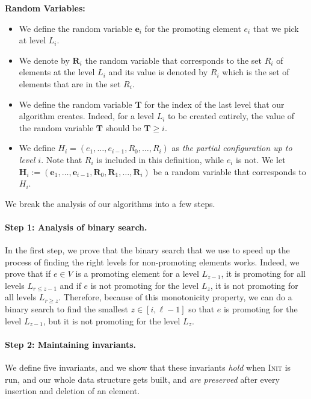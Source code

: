 \documentclass[11pt]{article}
\newcommand{\init}{\textsc{Init}}
\newcommand{\bR}{\ensuremath{\mathbf{R}}}
\newcommand{\bE}{\ensuremath{\mathbf{e}}}
\newcommand{\bT}{\ensuremath{\mathbf{T}}}
\newcommand{\bH}{\ensuremath{\mathbf{H}}}
\begin{document}
\begin{tcolorbox}[width=\linewidth, colback=white!80!gray,boxrule=0pt,frame hidden, sharp corners]

\textbf{Random Variables:}
\begin{itemize}
    \item  We define the random variable $\bE_i$ for the promoting element $e_i$ that we pick at level $L_i$. 
     \item  We denote by $\bR_i$ the random variable that corresponds to the set $R_i$ of elements at the level $L_i$ and its 
     value is denoted by $R_i$ which is the set of elements that are in the set $R_i$. 
    \item  We define the random variable $\bT$ for the index of the last level that our algorithm creates. 
    Indeed, for a level $L_i$ to be created entirely, the value of the random variable $\bT$ should be $\bT \ge i$.
    
    \item We define
    $H_i = (e_1, \dots, e_{i-1}, R_0, \dots, R_{i})$
    as \emph{the partial configuration up to level $i$}.
    Note that $R_{i}$ is included in this definition, while $e_{i}$ is not.
    We let 
    $\bH_i := (\bE_1, \dots, \bE_{i-1}, \bR_0,  \bR_{1}, \dots, \bR_{i})$ be a random variable that corresponds to $H_i$.
\end{itemize}

\end{tcolorbox}

We break the analysis of our algorithms into a few steps. 


\paragraph{Step 1: Analysis of binary search.} 
In the first step, we prove that the binary search that 
we use to speed up the process of finding the right levels for non-promoting elements  
works. Indeed, we prove that if $e \in V$ is a promoting element for a level $L_{z-1}$, 
it is promoting  for all levels $L_{r \le z-1}$ and 
if $e$ is not promoting  for the level $L_{z}$, 
it is not promoting  for all levels $L_{r \ge z}$. 
Therefore, because of this monotonicity property, we can do a binary search to find the smallest $z \in [i,\ell-1]$ so that 
$e$ is promoting  for the level $L_{z-1}$, but it is not promoting  for the level $L_{z}$. 



\paragraph{Step 2: Maintaining invariants.}
We define five invariants, and we show that these invariants \emph{hold} when \init{} is run, and our whole data structure gets built, and \emph{are preserved} after every insertion and deletion of an element. 
\end{document}
